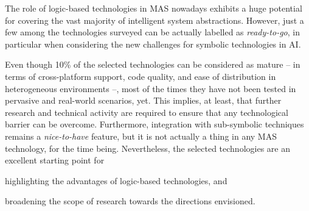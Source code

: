 \documentclass[12pt,a4paper,openright,twoside]{book}
\begin{document}
The role of logic-based technologies in MAS nowadays exhibits a huge potential for covering the vast majority of intelligent system abstractions.
%
However, just a few among the technologies surveyed can be actually labelled as \emph{ready-to-go}, in particular when considering the new challenges for symbolic technologies in AI.

Even though 10\% of the selected technologies can be considered as mature -- in terms of cross-platform support, code quality, and ease of distribution in heterogeneous environments --, most of the times they have not been tested in pervasive and real-world scenarios, yet.
%
This implies, at least, that further research and technical activity are required to ensure that any technological barrier can be overcome.
%
Furthermore, integration with sub-symbolic techniques remains a \emph{nice-to-have} feature, but it is not actually a thing in any MAS technology, for the time being.
%
Nevertheless, the selected technologies are an excellent starting point for
%
\begin{inlinelist}
    \item highlighting the advantages of logic-based technologies, and
    \item broadening the scope of research towards the directions envisioned.
\end{inlinelist}







%
\end{document}
